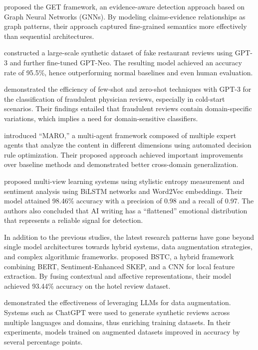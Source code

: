\documentclass[utf8]{FrontiersinHarvard}
\begin{document}
\citet{Xu2022} proposed the GET framework, an evidence-aware detection approach based on Graph Neural Networks (GNNs). By modeling claims-evidence relationships as graph patterns, their approach captured fine-grained semantics more effectively than sequential architectures.

\citet{Gambetti2023} constructed a large-scale synthetic dataset of fake restaurant reviews using GPT-3 and further fine-tuned GPT-Neo. The resulting model achieved an accuracy rate of 95.5\%, hence outperforming normal baselines and even human evaluation.

\citet{Shukla2023} demonstrated the efficiency of few-shot and zero-shot techniques with GPT-3 for the classification of fraudulent physician reviews, especially in cold-start scenarios. Their findings entailed that fraudulent reviews contain domain-specific variations, which implies a need for domain-sensitive classifiers.

\citet{LiH2025} introduced ``MARO,'' a multi-agent framework composed of multiple expert agents that analyze the content in different dimensions using automated decision rule optimization. Their proposed approach achieved important improvements over baseline methods and demonstrated better cross-domain generalization.

\citet{Wani2024} proposed multi-view learning systems using stylistic entropy measurement and sentiment analysis using BiLSTM networks and Word2Vec embeddings. Their model attained 98.46\% accuracy with a precision of 0.98 and a recall of 0.97. The authors also concluded that AI writing has a ``flattened'' emotional distribution that represents a reliable signal for detection.

In addition to the previous studies, the latest research patterns have gone beyond single model architectures towards hybrid systems, data augmentation strategies, and complex algorithmic frameworks. \citet{Lu2023} proposed BSTC, a hybrid framework combining BERT, Sentiment-Enhanced SKEP, and a CNN for local feature extraction. By fusing contextual and affective representations, their model achieved 93.44\% accuracy on the hotel review dataset.

\citet{Liu2025} demonstrated the effectiveness of leveraging LLMs for data augmentation. Systems such as ChatGPT were used to generate synthetic reviews across multiple languages and domains, thus enriching training datasets. In their experiments, models trained on augmented datasets improved in accuracy by several percentage points.
\end{document}
